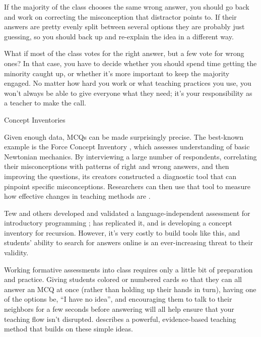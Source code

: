 If the majority of the class chooses the same wrong answer, you should
go back and work on correcting the misconception that distractor
points to.  If their answers are pretty evenly split between several
options they are probably just guessing, so you should back up and
re-explain the idea in a different way.

What if most of the class votes for the right answer, but a few vote
for wrong ones?  In that case, you have to decide whether you should
spend time getting the minority caught up, or whether it's more
important to keep the majority engaged.  No matter how hard you work
or what teaching practices you use, you won't always be able to give
everyone what they need; it's your responsibility as a teacher to make
the call.

\begin{callout}{Concept Inventories}

  Given enough data, MCQs can be made surprisingly precise. The
  best-known example is the Force Concept Inventory \cite{Hest1992},
  which assesses understanding of basic Newtonian mechanics. By
  interviewing a large number of respondents, correlating their
  misconceptions with patterns of right and wrong answers, and then
  improving the questions, its creators constructed a diagnostic tool
  that can pinpoint specific misconceptions.  Researchers can then use
  that tool to measure how effective changes in teaching methods are
  \cite{Hake1998}.

  Tew and others developed and validated a language-independent
  assessment for introductory programming \cite{Tew2011};
  \cite{Park2016} has replicated it, and \cite{Hamo2017} is developing
  a concept inventory for recursion. However, it's very costly to
  build tools like this, and students' ability to search for answers
  online is an ever-increasing threat to their validity.

\end{callout}

Working formative assessments into class requires only a little bit of
preparation and practice.  Giving students colored or numbered cards
so that they can all answer an MCQ at once (rather than holding up
their hands in turn), having one of the options be, ``I have no
idea'', and encouraging them to talk to their neighbors for a few
seconds before answering will all help ensure that your teaching flow
isn't disrupted.   describes a powerful,
evidence-based teaching method that builds on these simple ideas.


